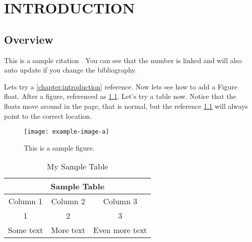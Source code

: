 \chapter{INTRODUCTION\label{chapter:introduction}}

\lipsum

\section{Overview\label{sec:overview}}

\lipsum[1]

This is a sample citation \autocite{Bob2011}.
You can see that the number is linked and will also auto update if you change the bibliography.

Lets try a \cref{chapter:introduction} reference.
Now lets see how to add a Figure float.
After a figure, referenced as \cref{fig:samplefigure}.
Let's try a table now.
Notice that the floats move around in the page, that is normal, but the reference \cref{tab:sampletable} will always point to the correct location.

\begin{figure}
    \centering %
    \texttt{[image: example-image-a]} %
    \caption{This is a sample figure.\label{fig:samplefigure}} %
\end{figure}


\begin{table} %
    \centering
    \caption{My Sample Table\label{tab:sampletable}}
    \begin{tabular}{c c c}
        \toprule
        \multicolumn{3}{c}{Sample Table} \\
        \midrule
        Column 1 & Column 2 & Column 3 \\
        \midrule
        1 & 2 & 3 \\  
        Some text & More text & Even more text \\
        \bottomrule
    \end{tabular}
\end{table}